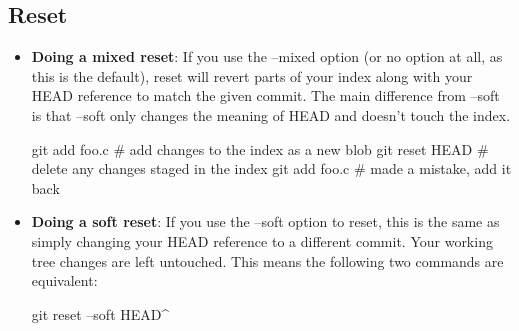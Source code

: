 \documentclass{report}
\begin{document}
    \pagebreak 
    \subsection{Reset}
    \begin{itemize}
        \item \textbf{Doing a mixed reset}: If you use the --mixed option (or no option at all, as this is the default), reset will revert parts of your index along with your HEAD reference to match the given commit. The main difference from --soft is that --soft only changes the meaning of HEAD and doesn’t touch the index.
            \bigbreak \noindent 
            \begin{bashcode}
                git add foo.c # add changes to the index as a new blob
                git reset HEAD # delete any changes staged in the index
                git add foo.c # made a mistake, add it back
            \end{bashcode}
        \item \textbf{Doing a soft reset}: If you use the --soft option to reset, this is the same as simply changing your HEAD reference to a different commit. Your working tree changes are left untouched. This means the following two commands are equivalent:
            \bigbreak \noindent 
            \begin{bashcode}
                git reset --soft HEAD^


\end{bashcode}
\end{itemize}
\end{document}
